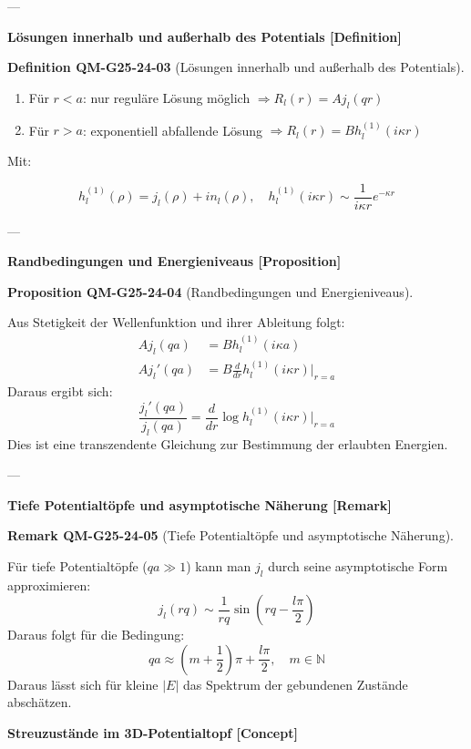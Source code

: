 \documentclass[10pt, letterpaper]{article}
\newcommand{\CustomHeading}[3]{%
  \par\medskip\noindent%
  \textbf{#1 #2} \textnormal{(#3)}.\enskip%
}
\newenvironment{DEF}[2]{\begin{unitbox}\CustomHeading{Definition}{#1}{#2}}{\end{unitbox}}
\newenvironment{PROP}[2]{\begin{unitbox}\CustomHeading{Proposition}{#1}{#2}}{\end{unitbox}}
\newenvironment{REM}[2]{\begin{unitbox}\CustomHeading{Remark}{#1}{#2}}{\end{unitbox}}
\begin{document}
---

\textbf{Lösungen innerhalb und außerhalb des Potentials [Definition]}

\begin{DEF}{QM-G25-24-03}{Lösungen innerhalb und außerhalb des Potentials}
\begin{enumerate}
  \item Für $r < a$: nur reguläre Lösung möglich $\Rightarrow R_l(r) = A j_l(qr)$
  \item Für $r > a$: exponentiell abfallende Lösung $\Rightarrow R_l(r) = B h_l^{(1)}(i \kappa r)$
\end{enumerate}

Mit:

\[
h_l^{(1)}(\rho) = j_l(\rho) + i n_l(\rho), \quad
h_l^{(1)}(i \kappa r) \sim \frac{1}{i \kappa r} e^{-\kappa r}
\]
\end{DEF}

---

\textbf{Randbedingungen und Energieniveaus [Proposition]}

\begin{PROP}{QM-G25-24-04}{Randbedingungen und Energieniveaus}
Aus Stetigkeit der Wellenfunktion und ihrer Ableitung folgt:
\[
\begin{aligned}
A j_l(qa) &= B h_l^{(1)}(i \kappa a) \\
A j_l'(qa) &= B \frac{d}{dr} h_l^{(1)}(i \kappa r)\big|_{r=a}
\end{aligned}
\]
Daraus ergibt sich:
\[
\frac{j_l'(qa)}{j_l(qa)} = \frac{d}{dr} \log h_l^{(1)}(i \kappa r) \Big|_{r=a}
\]
Dies ist eine transzendente Gleichung zur Bestimmung der erlaubten Energien.
\end{PROP}

---

\textbf{Tiefe Potentialtöpfe und asymptotische Näherung [Remark]}

\begin{REM}{QM-G25-24-05}{Tiefe Potentialtöpfe und asymptotische Näherung}
Für tiefe Potentialtöpfe ($qa \gg 1$) kann man $j_l$ durch seine asymptotische Form approximieren:
\[
j_l(rq) \sim \frac{1}{rq} \sin(rq - \frac{l\pi}{2})
\]
Daraus folgt für die Bedingung:
\[
qa \approx \left( m + \frac{1}{2} \right) \pi + \frac{l\pi}{2}, \quad m \in \mathbb{N}
\]
Daraus lässt sich für kleine $|E|$ das Spektrum der gebundenen Zustände abschätzen.
\end{REM}


\textbf{Streuzustände im 3D-Potentialtopf [Concept]}
\end{document}
